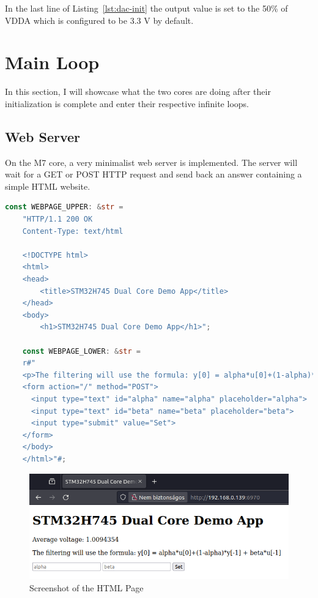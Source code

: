 In the last line of Listing~\ref{lst:dac-init} the output value is set to the 50\% of VDDA which is configured to be 3.3 V by default.

\section{Main Loop}

In this section, I will showcase what the two cores are doing after their initialization is complete and enter their respective infinite loops.

\subsection{Web Server}

On the M7 core, a very minimalist web server is implemented. The server will wait for a GET or POST HTTP request and send back an answer containing a simple HTML website.

\begin{lstlisting}[language=Rust,frame=single,float=!ht,style=customrust,label={lst:html-strings},caption={HTML Page Defined in a String}]
    const WEBPAGE_UPPER: &str =
    "HTTP/1.1 200 OK
    Content-Type: text/html

    <!DOCTYPE html>
    <html>
    <head>
        <title>STM32H745 Dual Core Demo App</title>
    </head>
    <body>
        <h1>STM32H745 Dual Core Demo App</h1>";

    const WEBPAGE_LOWER: &str =
    r#"
    <p>The filtering will use the formula: y[0] = alpha*u[0]+(1-alpha)*y[-1] + beta*u[-1]
    <form action="/" method="POST">
      <input type="text" id="alpha" name="alpha" placeholder="alpha">
      <input type="text" id="beta" name="beta" placeholder="beta">
      <input type="submit" value="Set">
    </form>
    </body>
    </html>"#;
\end{lstlisting}

\begin{figure}[!ht]
    \centering
    \includegraphics[width=150mm, keepaspectratio]{figures/webpage.png}
    \caption{Screenshot of the HTML Page}
    \label{fig:html-page}
\end{figure}

